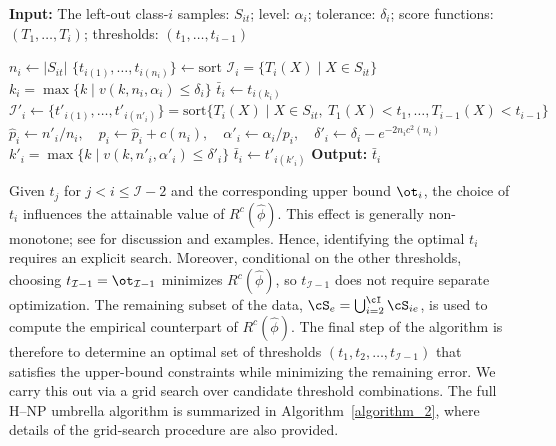 \begin{algorithm}[h!]

\caption{\textsc{UpperBound}$(S_{it}, \alpha_i, \delta_i, (T_1, \dots, T_i), (t_1, \dots, t_{i-1}))$}\label{alg:upper_bound}
\label{algorithm_1}
\textbf{Input:} The left-out class-$i$ samples: $S_{it}$; level: $\alpha_i$; tolerance: $\delta_i$;  score functions: $(T_1, \dots, T_i)$; thresholds: $(t_1, \dots, t_{i-1})$ 
\begin{algorithmic}[1]
\State $n_i \gets |S_{it}|$
\State $\{t_{i(1)}, \dots, t_{i(n_i)}\} \gets \text{sort } \mathcal{I}_i = \{T_i(X) \mid X \in S_{it}\}$
\State $k_i =  \max \{k \mid v(k,n_i,\alpha_i) \leq \delta_i\}$
\State $\bar{t}_i \gets t_{i(k_i)}$
    \State $\mathcal{I}'_i \gets \{t'_{i(1)}, \dots, t'_{i(n'_i)}\} = \text{sort}\{T_i(X) \mid X \in S_{it},\ T_1(X) < t_1, \dots, T_{i-1}(X) < t_{i-1}\}$
    \State $\hat{p}_i \gets n'_i/n_i,\quad p_i \gets \hat{p}_i + c(n_i),\quad \alpha'_i \gets \alpha_i/p_i,\quad \delta'_i \gets \delta_i - e^{-2n_ic^2(n_i)}$
        \State $k'_i =  \max \{k \mid v(k,n'_i,\alpha'_i) \leq \delta'_i\}$
        \State $\bar{t}_i \gets t'_{i(k'_i)}$
    \EndIf
\EndIf
\State \textbf{Output:} $\bar{t}_i$
\end{algorithmic}
\end{algorithm}


Given \(t_j\) for \(j < i \le \mathcal{I}-2\) and the corresponding upper bound \(\ot_i\), the choice of \(t_i\) influences the attainable value of \(R^c(\hat{\phi})\). This effect is generally non-monotone; see \citet{wang2024hierarchical} for discussion and examples. Hence, identifying the optimal \(t_i\) requires an explicit search. Moreover, conditional on the other thresholds, choosing \(t_{\mathcal{I}-1} = \ot_{\mathcal{I}-1}\) minimizes \(R^c(\hat{\phi})\), so \(t_{\mathcal{I}-1}\) does not require separate optimization. The remaining subset of the data, $\cS_e = \bigcup_{i=2}^{\cI} \cS_{ie}$, is used to compute the empirical counterpart of \(R^c(\hat{\phi})\). The final step of the algorithm is therefore to determine an optimal set of thresholds \((t_1, t_2, \ldots, t_{\mathcal{I}-1})\) that satisfies the upper-bound constraints while minimizing the remaining error. We carry this out via a grid search over candidate threshold combinations. The full H--NP umbrella algorithm is summarized in Algorithm~\ref{algorithm_2}, where details of the grid-search procedure are also provided.





